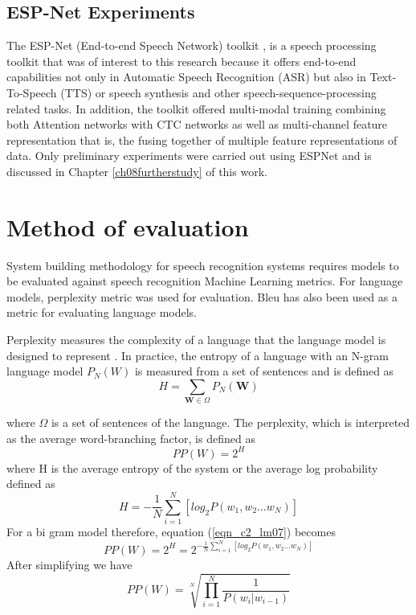 \subsection{ESP-Net Experiments}\label{c3sec_espnet}
The ESP-Net (End-to-end Speech Network) toolkit \citep{watanabe2018espnet}, is a speech processing toolkit that was of interest to this research because it offers end-to-end capabilities not only in Automatic Speech Recognition (ASR) but also in Text-To-Speech (TTS) or speech synthesis and other speech-sequence-processing related tasks.  In addition, the toolkit offered multi-modal training combining both Attention networks \cite{vaswani2017attention} with CTC networks as well as multi-channel feature representation that is, the fusing together of multiple feature representations of data.  Only preliminary experiments were carried out using ESPNet and is discussed in Chapter \ref{ch08furtherstudy} of this work.

\section{Method of evaluation}
System building methodology \citep{nunamaker1990systems} for speech recognition systems requires models to be evaluated against speech recognition Machine Learning metrics.  For language models, perplexity metric was used for evaluation.  Bleu has also been used as a metric for evaluating language models.

Perplexity measures the complexity of a language that the language model is designed to represent \citep{1976jelinekcontinuous}. In practice, the entropy of a language with an N-gram language model $P_N(W)$ is measured from a set of sentences and is defined as
\begin{equation}H=\sum_{\mathbf{W}\in\Omega}P_N(\mathbf{W})
\label{eqn_c2_lm05}
\end{equation}

where $\Omega$ is a set of sentences of the language. The perplexity, which is interpreted as the average word-branching factor, is defined as
\begin{equation}PP(W)=2^H
\label{eqn_c2_lm06}
\end{equation}
where H is the average entropy of the system or the average log probability defined as
\begin{equation}
H=-\frac{1}{N}\sum_{i=1}^N[log_2P(w_1,w_2\dots w_N)]
\label{eqn_c2_lm07}
\end{equation}
For a bi gram model therefore, equation (\ref{eqn_c2_lm07}) becomes
\begin{equation}
PP(W)=2^H=2^{-\frac{1}{N}\sum_{i=1}^N[log_2P(w_1,w_2\dots w_N)]}
\label{eqn_c2_lm08}
\end{equation}
After simplifying we have
\begin{equation}
PP(W)=\sqrt[N]{\prod_{i=1}^N\frac{1}{P(w_i|w_{i-1})}}
\label{eqn_c2_lm09}
\end{equation}


